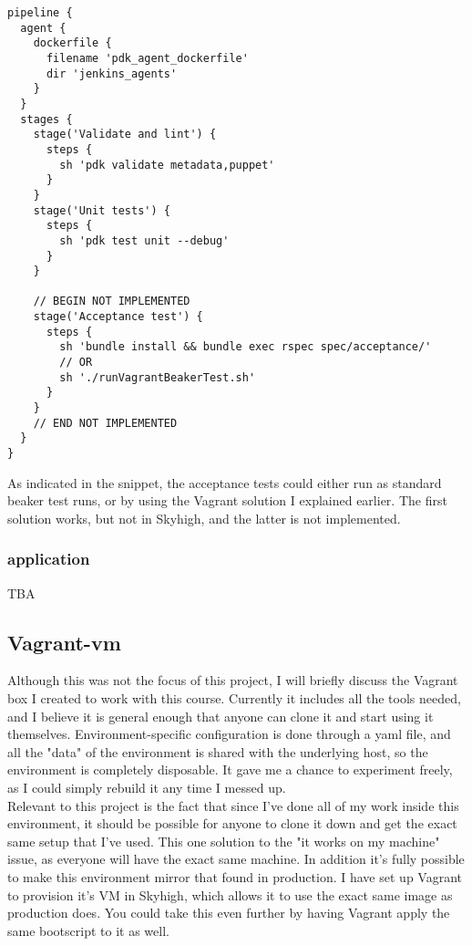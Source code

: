 \begin{verbatim}
pipeline {
  agent {
    dockerfile {
      filename 'pdk_agent_dockerfile'
      dir 'jenkins_agents'
    }
  }
  stages {
    stage('Validate and lint') {
      steps {
        sh 'pdk validate metadata,puppet'
      }
    }
    stage('Unit tests') {
      steps {
        sh 'pdk test unit --debug'
      }
    }

    // BEGIN NOT IMPLEMENTED
    stage('Acceptance test') {
      steps {
        sh 'bundle install && bundle exec rspec spec/acceptance/'
        // OR
        sh './runVagrantBeakerTest.sh'
      }
    }
    // END NOT IMPLEMENTED
  }
}
\end{verbatim}

As indicated in the snippet, the acceptance tests could either run as standard beaker test runs, or by using the Vagrant solution I explained earlier. The first solution works, but not in Skyhigh, and the latter is not implemented.

\subsubsection{application} %

TBA


\subsection{Vagrant-vm}

Although this was not the focus of this project, I will briefly discuss the Vagrant box I created to work with this course. Currently it includes all the tools needed, and I believe it is general enough that anyone can clone it and start using it themselves. Environment-specific configuration is done through a yaml file, and all the "data" of the environment is shared with the underlying host, so the environment is completely disposable. It gave me a chance to experiment freely, as I could simply rebuild it any time I messed up.
\\
Relevant to this project is the fact that since I've done all of my work inside this environment, it should be possible for anyone to clone it down and get the exact same setup that I've used. This one solution to the "it works on my machine" issue, as everyone will have the exact same machine. In addition it's fully possible to make this environment mirror that found in production. I have set up Vagrant to provision it's VM in Skyhigh, which allows it to use the exact same image as production does. You could take this even further by having Vagrant apply the same bootscript to it as well.



